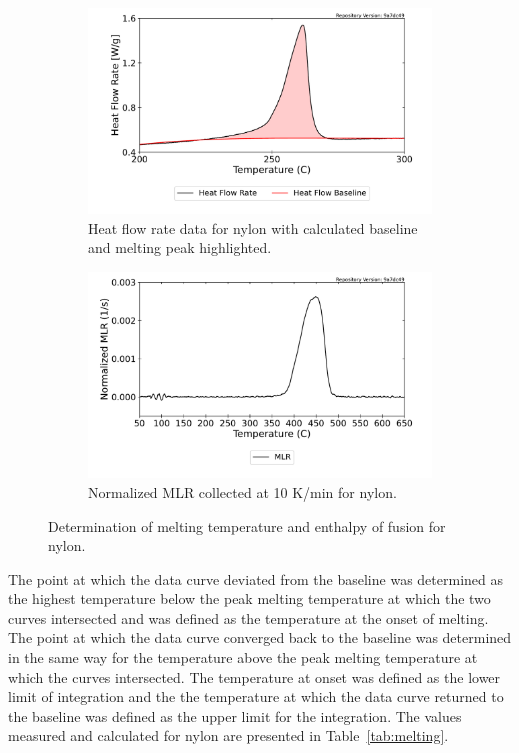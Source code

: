 \documentclass[12pt,oneside]{book}
\begin{document}
\begin{figure}[H]
    \centering
    \begin{subfigure}[b]{0.475\textwidth}
        \centering
        \includegraphics[width=\textwidth]{Figures/Nylon_Melting.pdf}
        \caption{Heat flow rate data for nylon with calculated baseline and melting peak highlighted.}
    \end{subfigure}
    \hfill
    \begin{subfigure}[b]{0.475\textwidth}
        \centering
        \includegraphics[width=\textwidth]{Figures/Nylon_10K_MLR.pdf}
        \caption{Normalized MLR collected at 10 K/min for nylon.}
    \end{subfigure}
    \caption[Determination of Melting Temperature and Enthalpy of Fusion for Nylon] {Determination of melting temperature and enthalpy of fusion for nylon.} 
    \label{fig:nylon_melting}
\end{figure}

The point at which the data curve deviated from the baseline was determined as the highest temperature below the peak melting temperature at which the two curves intersected and was defined as the temperature at the onset of melting. The point at which the data curve converged back to the baseline was determined in the same way for the temperature above the peak melting temperature at which the curves intersected. The temperature at onset was defined as the lower limit of integration and the the temperature at which the data curve returned to the baseline was defined as the upper limit for the integration. The values measured and calculated for nylon are presented in Table~\ref{tab:melting}.
\end{document}
